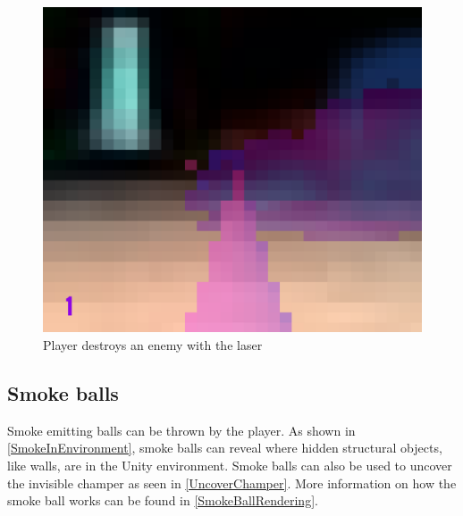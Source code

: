 \begin{figure}[p]
  \includegraphics[height=\imgWithTripple, width=\imgWithTripple]{images/game_systems/Shoot3.png}
  \caption{Player destroys an enemy with the laser}
  \label{DestroyEnemy}
\end{figure}


\subsection{Smoke balls}
Smoke emitting  balls can be thrown by the player. As shown in \cref{SmokeInEnvironment}, smoke balls can reveal where hidden structural objects, like walls, are in the Unity environment. Smoke balls can also be used to uncover the invisible champer as seen in \cref{UncoverChamper}. More information on how the smoke ball works can be found in \cref{SmokeBallRendering}.

